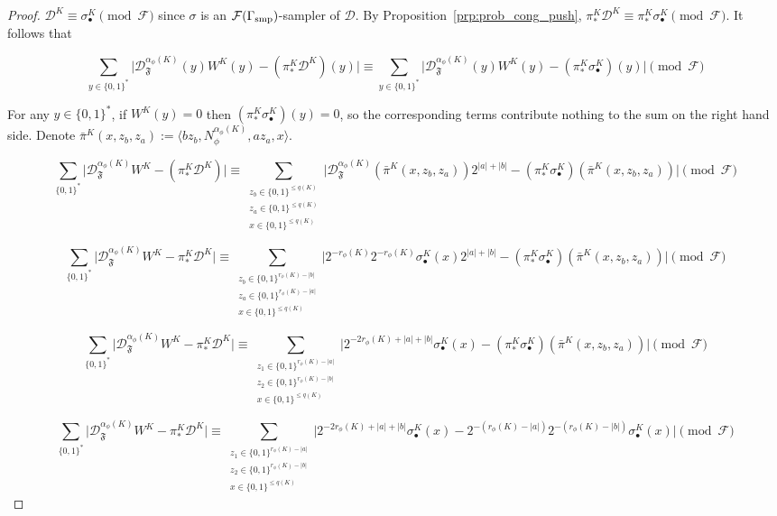 \documentclass{article}
\numberwithin{equation}{section}
\theoremstyle{definition}
\theoremstyle{plain}
\newcommand{\Bool}{\{0,1\}}
\newcommand{\Words}{{\Bool^*}}
\newcommand{\Abs}[1]{\lvert #1 \rvert}
\newcommand{\Chev}[1]{\langle #1 \rangle}
\newcommand{\Dist}{\mathcal{D}}
\newcommand{\Fall}{\mathcal{F}}
\begin{document}
\begin{proof}
${\Dist^K \equiv \sigma_\bullet^K \pmod{\Fall}}$ since ${\sigma}$ is an ${\Fall(\Gamma_{\textnormal{smp}})}$-sampler of ${\Dist}$. By Proposition~\ref{prp:prob_cong_push}, ${\pi_*^K\Dist^K \equiv \pi_*^K\sigma_\bullet^K \pmod{\Fall}}$. It follows that

\[\sum_{y \in \Words} \Abs{\Dist_{\mathfrak{F}}^{\alpha_\phi(K)}(y)W^K(y)-(\pi_*^K\Dist^K)(y)} \equiv \sum_{y \in \Words} \Abs{\Dist_{\mathfrak{F}}^{\alpha_\phi(K)}(y)W^K(y)-(\pi_*^K\sigma_\bullet^K)(y)} \pmod{\Fall}\]

For any ${y \in \Words}$, if ${W^K(y)=0}$ then ${(\pi_*^K\sigma_\bullet^K)(y) = 0}$, so the corresponding terms contribute nothing to the sum on the right hand side. Denote ${\bar{\pi}^K(x,z_b,z_a):=\Chev{bz_b,N_\phi^{\alpha_\phi(K)},az_a,x}}$.

\[\sum_{\Words} \Abs{\Dist_{\mathfrak{F}}^{\alpha_\phi(K)}W^K-(\pi_*^K\Dist^K)} \equiv \sum_{\substack{z_b \in \Bool^{\leq q(K)}\\z_a \in \Bool^{\leq q(K)}\\x \in \Bool^{\leq q(K)}}} \Abs{\Dist_{\mathfrak{F}}^{\alpha_\phi(K)}(\bar{\pi}^K(x,z_b,z_a))2^{\Abs{a}+\Abs{b}}-(\pi_*^K\sigma_\bullet^K)(\bar{\pi}^K(x,z_b,z_a))} \pmod{\Fall}\]

\[\sum_{\Words} \Abs{\Dist_{\mathfrak{F}}^{\alpha_\phi(K)}W^K-\pi_*^K\Dist^K} \equiv \sum_{\substack{z_b \in \Bool^{r_\phi(K)-\Abs{b}}\\z_a \in \Bool^{r_\phi(K)-\Abs{a}}\\x \in \Bool^{\leq q(K)}}} \Abs{2^{-r_\phi(K)}2^{-r_\phi(K)}\sigma_\bullet^K(x) 2^{\Abs{a}+\Abs{b}}-(\pi_*^K\sigma_\bullet^K)(\bar{\pi}^K(x,z_b,z_a))} \pmod{\Fall}\]

\[\sum_{\Words} \Abs{\Dist_{\mathfrak{F}}^{\alpha_\phi(K)}W^K-\pi_*^K\Dist^K} \equiv \sum_{\substack{z_1 \in \Bool^{r_\phi(K)-\Abs{a}}\\z_2 \in \Bool^{r_\phi(K)-\Abs{b}}\\x \in \Bool^{\leq q(K)}}} \Abs{2^{-2r_\phi(K)+\Abs{a}+\Abs{b}}\sigma_\bullet^K(x) -(\pi_*^K\sigma_\bullet^K)(\bar{\pi}^K(x,z_b,z_a))} \pmod{\Fall}\]

\[\sum_{\Words} \Abs{\Dist_{\mathfrak{F}}^{\alpha_\phi(K)}W^K-\pi_*^K\Dist^K} \equiv \sum_{\substack{z_1 \in \Bool^{r_\phi(K)-\Abs{a}}\\z_2 \in \Bool^{r_\phi(K)-\Abs{b}}\\x \in \Bool^{\leq q(K)}}} \Abs{2^{-2r_\phi(K)+\Abs{a}+\Abs{b}}\sigma_\bullet^K(x) -2^{-(r_\phi(K)-\Abs{a})}2^{-(r_\phi(K)-\Abs{b})}\sigma_\bullet^K(x)} \pmod{\Fall}\]


\end{proof}
\end{document}
